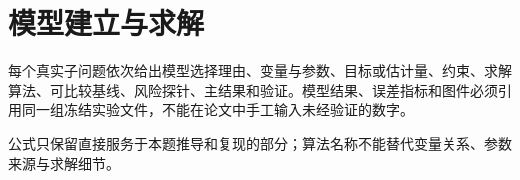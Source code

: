 \section{模型建立与求解}
每个真实子问题依次给出模型选择理由、变量与参数、目标或估计量、约束、求解算法、可比较基线、风险探针、主结果和验证。模型结果、误差指标和图件必须引用同一组冻结实验文件，不能在论文中手工输入未经验证的数字。

公式只保留直接服务于本题推导和复现的部分；算法名称不能替代变量关系、参数来源与求解细节。
